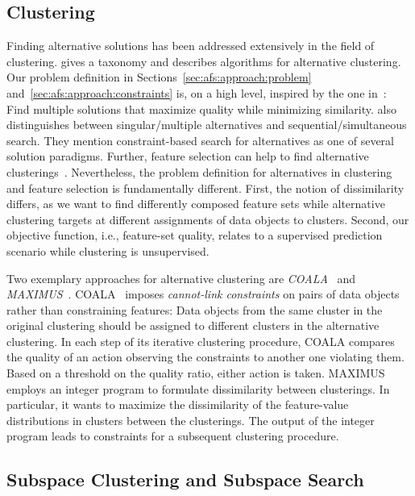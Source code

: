 \documentclass{article}
\theoremstyle{definition}
\begin{document}
\subsection{Clustering}
\label{sec:afs:related-work:clustering}

Finding alternative solutions has been addressed extensively in the field of clustering.
\cite{bailey2014alternative} gives a taxonomy and describes algorithms for alternative clustering.
Our problem definition in Sections~\ref{sec:afs:approach:problem} and~\ref{sec:afs:approach:constraints} is, on a high level, inspired by the one in~\cite{bailey2014alternative}:
Find multiple solutions that maximize quality while minimizing similarity.
\cite{bailey2014alternative} also distinguishes between singular/multiple alternatives and sequential/simultaneous search.
They mention constraint-based search for alternatives as one of several solution paradigms.
Further, feature selection can help to find alternative clusterings~\cite{tao2012novel}.
Nevertheless, the problem definition for alternatives in clustering and feature selection is fundamentally different.
First, the notion of dissimilarity differs, as we want to find differently composed feature sets while alternative clustering targets at different assignments of data objects to clusters.
Second, our objective function, i.e., feature-set quality, relates to a supervised prediction scenario while clustering is unsupervised.

Two exemplary approaches for alternative clustering are \emph{COALA}~\cite{bae2006coala} and \emph{MAXIMUS}~\cite{bae2010clustering}.
COALA~\cite{bae2006coala} imposes \emph{cannot-link constraints} on pairs of data objects rather than constraining features:
Data objects from the same cluster in the original clustering should be assigned to different clusters in the alternative clustering.
In each step of its iterative clustering procedure, COALA compares the quality of an action observing the constraints to another one violating them.
Based on a threshold on the quality ratio, either action is taken.
MAXIMUS~\cite{bae2010clustering} employs an integer program to formulate dissimilarity between clusterings.
In particular, it wants to maximize the dissimilarity of the feature-value distributions in clusters between the clusterings.
The output of the integer program leads to constraints for a subsequent clustering procedure.

\subsection{Subspace Clustering and Subspace Search}
\label{sec:afs:related-work:subspace}
\end{document}
